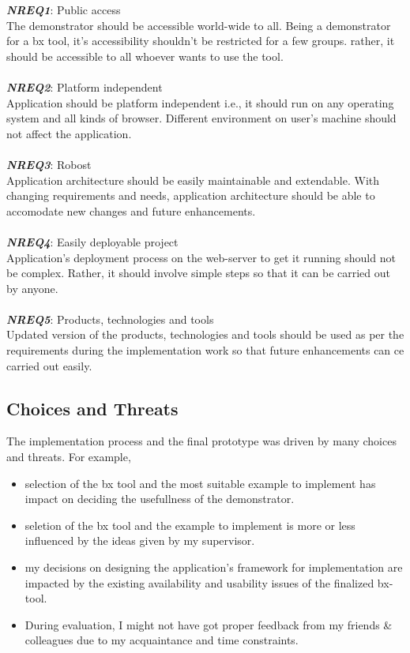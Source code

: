 \textbf{\textit{NREQ1}}: Public access\\
The demonstrator should be accessible world-wide to all. Being a demonstrator for a bx tool, it's accessibility shouldn't be restricted for a few groups. rather, it should be accessible to all whoever wants to use the tool.\\\\ 
\textbf{\textit{NREQ2}}: Platform independent\\ 
Application should be platform independent i.e., it should run on any operating system and all kinds of browser. Different environment on user's machine should not affect the application.\\\\
\textbf{\textit{NREQ3}}: Robost\\
Application architecture should be easily maintainable and extendable. With changing requirements and needs, application architecture should be able to accomodate new changes and future enhancements.\\\\
\textbf{\textit{NREQ4}}: Easily deployable project\\
Application's deployment process on the web-server to get it running should not be complex. Rather, it should involve simple steps so that it can be carried out by anyone.\\\\
\textbf{\textit{NREQ5}}: Products, technologies and tools\\
Updated version of the products, technologies and tools should be used as per the requirements during the implementation work so that future enhancements can ce carried out easily.

\subsection{Choices and Threats}\label{subsec:choicesthreats}
The implementation process and the final prototype was driven by many choices and threats. For example, 
\begin{itemize} 
	\item {selection of the bx tool and the most suitable example to implement has impact on deciding the usefullness of the demonstrator.}
	\item {seletion of the bx tool and the example to implement is more or less influenced by the ideas given by my supervisor.} 
	\item {my decisions on designing the application's framework for implementation are impacted by the existing availability and usability issues of the finalized bx-tool.}
	\item {During evaluation, I might not have got proper feedback from my friends \& colleagues due to my acquaintance and time constraints.}
\end{itemize}
